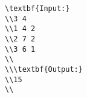 \begin{verbatim}
\textbf{Input:}
\\3 4
\\1 4 2
\\2 7 2
\\3 6 1
\\
\\\textbf{Output:}
\\15
\\\end{verbatim}